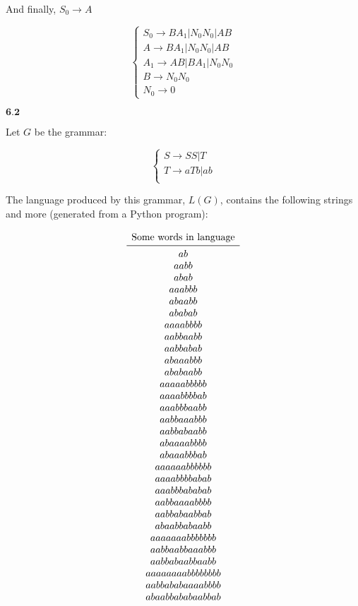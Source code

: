 \documentclass{article}
\newcommand{\problem}[1]{$\boxed{\textbf{#1}}$}
\begin{document}
And finally, $S_0\rightarrow{}A$

\[\begin{cases}
S_0\rightarrow BA_1 | N_0 N_0 | AB \\
A\rightarrow BA_1 | N_0 N_0 | AB \\
A_1\rightarrow AB | BA_1 | N_0 N_0 \\
B\rightarrow N_0 N_0  \\
N_0\rightarrow 0
\end{cases}\]

\problem{6.2}

Let $G$ be the grammar:

\[\begin{cases}
S\rightarrow SS | T \\
T\rightarrow a T b | ab \\
\end{cases}\]

The language produced by this grammar, $L(G)$, contains the following
strings and more (generated from a Python program):

\[\begin{array}{c}
\text{Some words in language} \\
\midrule
ab \\ aabb \\ abab \\ aaabbb \\ abaabb \\ ababab \\ aaaabbbb \\ aabbaabb \\ aabbabab \\
abaaabbb \\ ababaabb \\ aaaaabbbbb \\ aaaabbbbab \\ aaabbbaabb \\ aabbaaabbb \\ aabbabaabb \\
abaaaabbbb \\ abaaabbbab \\ aaaaaabbbbbb \\ aaaabbbbabab \\ aaabbbababab \\ aabbaaaabbbb \\ aabbabaabbab \\
abaabbabaabb \\ aaaaaaabbbbbbb \\ aabbaabbaaabbb \\ aabbabaabbaabb \\ aaaaaaaabbbbbbbb \\ aabbababaaaabbbb \\ abaabbababaabbab \\
\end{array}\]
\end{document}
